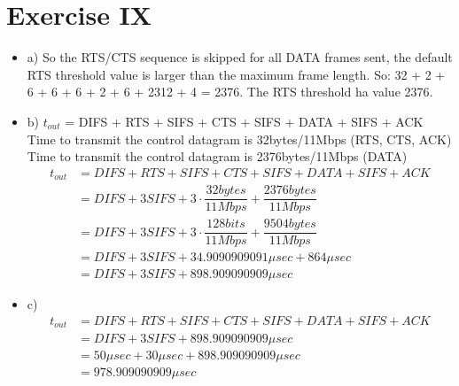 \documentclass[11pt]{article}
\begin{document}
	\section*{Exercise IX}
	\begin{itemize}
		\item{a)} So the RTS/CTS sequence is skipped for all DATA frames sent, the default RTS threshold value is larger than the maximum frame length. So:
		32 + 2 + 6 + 6 + 6 + 2 + 6 + 2312 + 4 = 2376. The RTS threshold ha value 2376.
		\item{b)}
		$t_{out}$ = DIFS + RTS + SIFS + CTS + SIFS + DATA + SIFS + ACK \\
		Time to transmit the control datagram is 32bytes/11Mbps (RTS, CTS, ACK)\\
		Time to transmit the control datagram is 2376bytes/11Mbps (DATA)\\
		$$
		\begin{aligned}
			t_{out} &= DIFS + RTS + SIFS + CTS + SIFS + DATA + SIFS + ACK \\
			&= DIFS + 3 SIFS + 3 \cdot \dfrac{32 bytes}{11 Mbps} + \dfrac{2376 bytes}{11 Mbps}\\
			&= DIFS + 3 SIFS + 3 \cdot \dfrac{128 bits}{11 Mbps} + \dfrac{9504 bytes}{11 Mbps}\\
			&= DIFS + 3 SIFS + 34.9090909091 \mu sec + 864 \mu sec\\
			&= DIFS + 3 SIFS + 898.909090909 \mu sec
		\end{aligned}
		$$
		\item{c)}
		$$
		\begin{aligned}
			t_{out} &= DIFS + RTS + SIFS + CTS + SIFS + DATA + SIFS + ACK \\
			&= DIFS + 3 SIFS + 898.909090909 \mu sec \\
			&= 50 \mu sec + 30 \mu sec + 898.909090909 \mu sec\\
			&= 978.909090909 \mu sec
		\end{aligned}
		$$
	\end{itemize}
\end{document}
